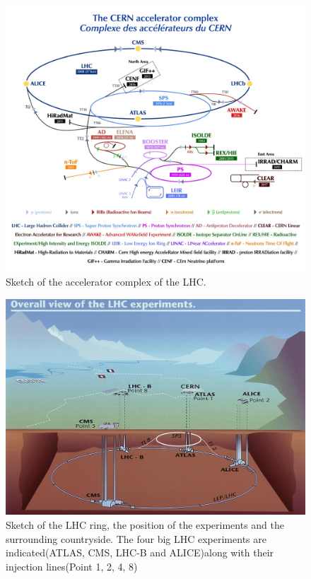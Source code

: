 \begin{figure}[htbp]
\centering
\includegraphics[width=\figwidth]{figures_LHC/CCC-v2018-print-v2.jpg}
\caption[Sketch of the LHC accelerator complex]{Sketch of the accelerator complex of the LHC.~\cite{Mobs:2636343}}
\label{fig:accelerator_complex}
\end{figure}

\begin{figure}[htbp]
  \centering
  \includegraphics[scale=0.4]{figures_LHC/CERN-all-experiments.jpg}
  \caption[Sketch of the LHC ring.]{Sketch of the LHC ring, the position
    of the experiments and the surrounding countryside. The four big
    LHC experiments are indicated(ATLAS, CMS, LHC-B and ALICE)along with their injection lines(Point 1, 2, 4, 8)\cite{Jean-Luc:841555}}
  \label{fig:LHC}
\end{figure}


